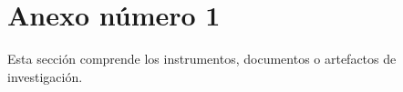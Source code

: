 \titlespacing{\chapter}{0pt}{-30pt}{0pt}
\chapter{Anexo número 1}
\label{cap:anexo1}

Esta sección comprende los instrumentos, documentos o artefactos de investigación.